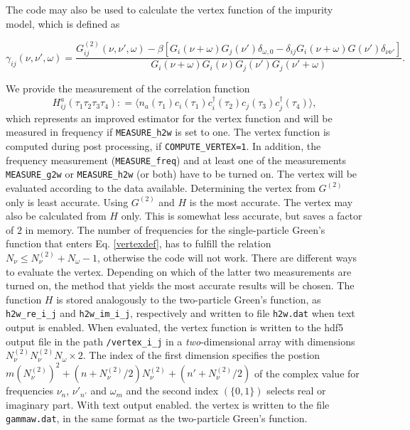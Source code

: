 \documentclass[aps,prb,floatfix,superscriptaddress,twocolumn,notitlepage]{revtex4-1}
\newcommand\Let{\mathrel{\mathop:\!\!=}}
\begin{document}
The code may also be used to calculate the vertex function of the impurity model, which is defined as
\begin{widetext}
\begin{equation}
\gamma_{ij}(\nu,\nu',\omega) = \frac{G^{(2)}_{ij}(\nu,\nu',\omega) - \beta[G_{i}(\nu+\omega)G_{j}(\nu')\delta_{\omega,0} - \delta_{ij}G_{i}(\nu+\omega)G(\nu')\delta_{\nu\nu'}]}{G_{i}(\nu+\omega)G_{i}(\nu)G_{j}(\nu')G_{j}(\nu'+\omega)}.
\label{vertexdef}
\end{equation}
\end{widetext}
We provide the measurement of the correlation function
\begin{equation}
H^{a}_{ij}(\tau_{1}\tau_{2}\tau_{3}\tau_{4}) \Let \langle n_{a}(\tau_{1})c_{i}(\tau_{1})c^{\dagger}_{i}(\tau_{2})c_{j}(\tau_{3})c^{\dagger}_{j}(\tau_{4})\rangle,
\end{equation}
which represents an improved estimator for the vertex function\cite{Hafermann12} and will be measured in frequency if \verb#MEASURE_h2w# is set to one.
The vertex function is computed during post processing, if \verb#COMPUTE_VERTEX=1#. In addition, the frequency measurement (\verb#MEASURE_freq#) and at least one of the measurements \verb#MEASURE_g2w# or \verb#MEASURE_h2w# (or both) have to be turned on. The vertex will be evaluated according to the data available. Determining the vertex from $G^{(2)}$ only is least accurate. Using $G^{(2)}$ and $H$ is the most accurate. The vertex may also be calculated from $H$ only. This is somewhat less accurate, but saves a factor of $2$ in memory.
The number of frequencies for the single-particle Green's function that enters Eq. \eqref{vertexdef}, has to fulfill the relation $N_{\nu}\leq N_{\nu}^{(2)}+N_{\omega}-1$, otherwise the code will not work.
There are different ways to evaluate the vertex. Depending on which of the latter two measurements are turned on, the method that yields the most accurate results will be chosen.
The function $H$ is stored analogously to the two-particle Green's function, as \verb#h2w_re_i_j# and \verb#h2w_im_i_j#, respectively and written to file \verb#h2w.dat# when text output is enabled.
When evaluated, the vertex function is written to the hdf5 output file in the path \verb#/vertex_i_j# in a \emph{two}-dimensional array with dimensions $N_{\nu}^{(2)}N_{\nu}^{(2)}N_{\omega}\times 2$. The index of the first dimension specifies the postion $m(N^{(2)}_\nu)^{2} + (n+N^{(2)}_{\nu}/2)N^{(2)}_{\nu} + (n'+N^{(2)}_{\nu}/2)$ of the complex value for frequencies $\nu_{n}$, $\nu'_{n'}$ and $\omega_{m}$ and the second index $(\{0,1\})$ selects real or imaginary part.
With text output enabled. the vertex is written to the file \verb#gammaw.dat#, in the same format as the two-particle Green's function.
\end{document}
